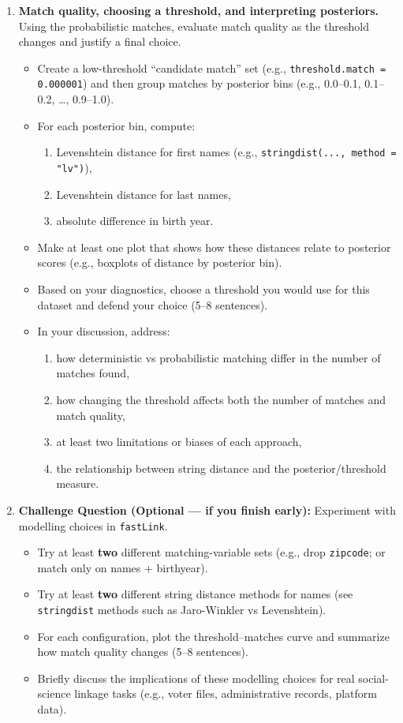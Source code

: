 \documentclass[11pt]{article}
\begin{document}
\begin{enumerate}
\item \textbf{Match quality, choosing a threshold, and interpreting posteriors.}
Using the probabilistic matches, evaluate match quality as the threshold changes and justify a final choice.
\begin{itemize}
  \item Create a low-threshold ``candidate match'' set (e.g., \texttt{threshold.match = 0.000001}) and then group matches by posterior bins (e.g., 0.0--0.1, 0.1--0.2, \dots, 0.9--1.0).
  \item For each posterior bin, compute:
  \begin{enumerate}
    \item Levenshtein distance for first names (e.g., \texttt{stringdist(..., method = "lv")}),
    \item Levenshtein distance for last names,
    \item absolute difference in birth year.
  \end{enumerate}
  \item Make at least one plot that shows how these distances relate to posterior scores (e.g., boxplots of distance by posterior bin).
  \item Based on your diagnostics, choose a threshold you would use for this dataset and defend your choice (5--8 sentences).
  \item In your discussion, address:
  \begin{enumerate}
    \item how deterministic vs probabilistic matching differ in the number of matches found,
    \item how changing the threshold affects both the number of matches and match quality,
    \item at least two limitations or biases of each approach,
    \item the relationship between string distance and the posterior/threshold measure.
  \end{enumerate}
\end{itemize}

\item \textbf{Challenge Question (Optional --- if you finish early):}
Experiment with modelling choices in \texttt{fastLink}.
\begin{itemize}
  \item Try at least \textbf{two} different matching-variable sets (e.g., drop \texttt{zipcode}; or match only on names + birthyear).
  \item Try at least \textbf{two} different string distance methods for names (see \texttt{stringdist} methods such as Jaro-Winkler vs Levenshtein).
  \item For each configuration, plot the threshold--matches curve and summarize how match quality changes (5--8 sentences).
  \item Briefly discuss the implications of these modelling choices for real social-science linkage tasks (e.g., voter files, administrative records, platform data).
\end{itemize}

\end{enumerate}
\end{document}

